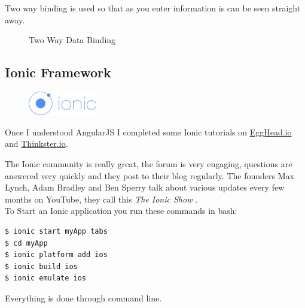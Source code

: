 Two way binding is used so that as you enter information is can be seen straight away.
\begin{figure}[H] 
	\caption{Two Way Data Binding}
	\label{fig:speciation}
\end{figure}

\subsection{Ionic Framework}
\begin{figure}
	\includegraphics[width=3cm]{img/mobile-app/logos/ionic.png}
\end{figure} 
Once I understood AngularJS I completed some Ionic tutorials on \url{EggHead.io} and \url{Thinkster.io}.

The Ionic \cite{ionic} community is really great, the forum is very engaging, questions are answered very quickly and they post to their blog regularly.
The  founders Max Lynch, Adam Bradley and Ben Sperry talk about various updates every few months on YouTube, they call this \textit{The Ionic Show} \cite{ionic_show}.
\\

To Start an Ionic application you run these commands in bash:
\begin{verbatim}
$ ionic start myApp tabs
$ cd myApp
$ ionic platform add ios
$ ionic build ios
$ ionic emulate ios
\end{verbatim}
Everything is done through command line.


